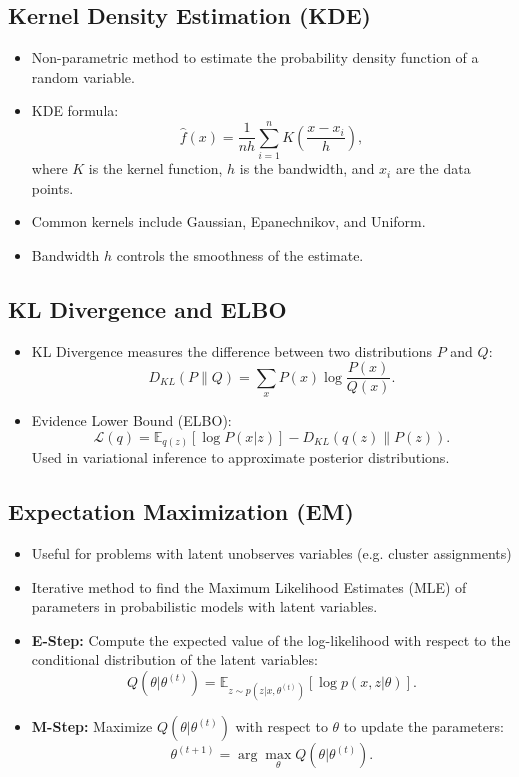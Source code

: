 \documentclass[12pt,a4paper]{article}
\begin{document}
\subsection{Kernel Density Estimation (KDE)}
\begin{itemize}
    \item Non-parametric method to estimate the probability density function of a random variable.
    \item KDE formula:
    \[ \hat{f}(x) = \frac{1}{nh} \sum_{i=1}^n K\left(\frac{x - x_i}{h}\right), \]
    where $K$ is the kernel function, $h$ is the bandwidth, and $x_i$ are the data points.
    \item Common kernels include Gaussian, Epanechnikov, and Uniform.
    \item Bandwidth $h$ controls the smoothness of the estimate.
\end{itemize}

\subsection{KL Divergence and ELBO}
\begin{itemize}
    \item KL Divergence measures the difference between two distributions $P$ and $Q$:
    \[ D_{KL}(P \| Q) = \sum_x P(x) \log \frac{P(x)}{Q(x)}. \]
    \item Evidence Lower Bound (ELBO):
    \[ \mathcal{L}(q) = \mathbb{E}_{q(z)}[\log P(x | z)] - D_{KL}(q(z) \| P(z)). \]
    Used in variational inference to approximate posterior distributions.
\end{itemize}
\subsection{Expectation Maximization (EM)}
\begin{itemize}
    \item Useful for problems with latent unobserves variables (e.g. cluster assignments)
    \item Iterative method to find the Maximum Likelihood Estimates (MLE) of parameters in probabilistic models with latent variables.
    \item \textbf{E-Step:} Compute the expected value of the log-likelihood with respect to the conditional distribution of the latent variables:
    \[ Q(\theta | \theta^{(t)}) = \mathbb{E}_{z \sim p(z|x, \theta^{(t)})}[\log p(x, z | \theta)]. \]
    \item \textbf{M-Step:} Maximize $Q(\theta | \theta^{(t)})$ with respect to $\theta$ to update the parameters:
    \[ \theta^{(t+1)} = \arg\max_{\theta} Q(\theta | \theta^{(t)}). \]
\end{itemize}
\end{document}
